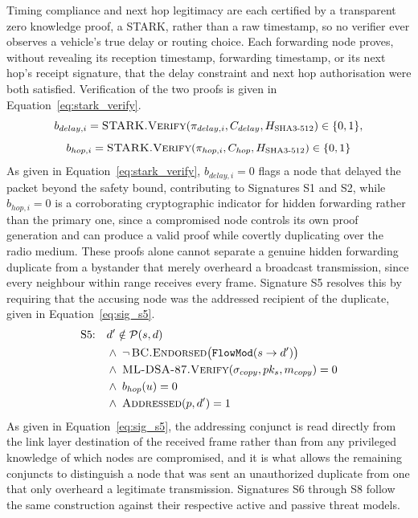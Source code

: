 \documentclass[lettersize,journal]{IEEEtran}
\theoremstyle{plain}
\theoremstyle{remark}
\begin{document}
	Timing compliance and next hop legitimacy are each certified by a
	transparent zero knowledge proof, a STARK, rather than a raw timestamp,
	so no verifier ever observes a vehicle's true delay or routing choice.
	Each forwarding node proves, without revealing its reception timestamp,
	forwarding timestamp, or its next hop's receipt signature, that the
	delay constraint and next hop authorisation were both satisfied.
	Verification of the two proofs is given in
	Equation~\eqref{eq:stark_verify}.
	\begin{equation}
		b_{delay,i} = \textsc{STARK.Verify}(\pi_{delay,i}, C_{delay}, H_{\text{SHA3-512}}) \in \{0,1\},
	\end{equation}
	\begin{equation}
		b_{hop,i} = \textsc{STARK.Verify}(\pi_{hop,i}, C_{hop}, H_{\text{SHA3-512}}) \in \{0,1\}
		\label{eq:stark_verify}
	\end{equation}
	As given in Equation~\eqref{eq:stark_verify}, $b_{delay,i}{=}0$ flags a
	node that delayed the packet beyond the safety bound, contributing to
	Signatures S1 and S2, while $b_{hop,i}{=}0$ is a corroborating
	cryptographic indicator for hidden forwarding rather than the primary
	one, since a compromised node controls its own proof generation and can
	produce a valid proof while covertly duplicating over the radio medium.
	These proofs alone cannot separate a genuine hidden forwarding duplicate
	from a bystander that merely overheard a broadcast transmission, since
	every neighbour within range receives every frame. Signature S5
	resolves this by requiring that the accusing node was the addressed
	recipient of the duplicate, given in Equation~\eqref{eq:sig_s5}.
	\begin{equation}
		\begin{aligned}
			\text{S5:}\quad
			& d' \notin \mathcal{P}(s,d) \\
			& \wedge\; \neg\,\textsc{BC.Endorsed}\big(\texttt{FlowMod}(s \to d')\big) \\
			& \wedge\; \textsc{ML-DSA-87.Verify}(
			\sigma_{copy}, pk_s, m_{copy}) = 0 \\
			& \wedge\; b_{hop}(u) = 0 \\
			& \wedge\; \textsc{Addressed}(p, d') = 1
		\end{aligned}
		\label{eq:sig_s5}
	\end{equation}
	As given in Equation~\eqref{eq:sig_s5}, the addressing conjunct is read
	directly from the link layer destination of the received frame rather
	than from any privileged knowledge of which nodes are compromised, and it
	is what allows the remaining conjuncts to distinguish a node that was
	sent an unauthorized duplicate from one that only overheard a legitimate
	transmission. Signatures S6 through S8 follow the same construction
	against their respective active and passive threat models.
	
\end{document}
